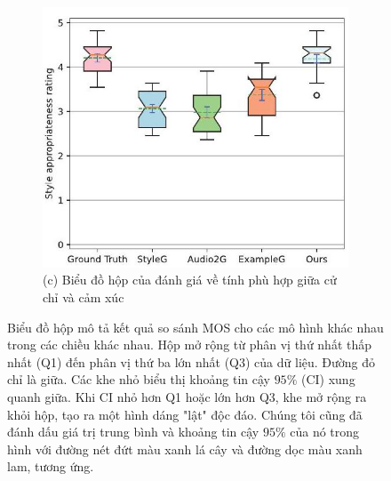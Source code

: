 \begin{figure}[htbp]
\begin{subfigure}[b]{0.3\textwidth}
    \end{subfigure}
    \hfill
    \begin{subfigure}[b]{0.3\textwidth}
        \includegraphics[width=\textwidth]{images/style_score.jpg}
        \caption*{(c) Biểu đồ hộp của đánh giá về tính phù hợp giữa cử chỉ và cảm xúc}
    \end{subfigure}
    \caption[Biểu đồ hộp mô tả kết quả so sánh MOS]{Biểu đồ hộp mô tả kết quả so sánh MOS cho các mô hình khác nhau trong các chiều khác nhau. Hộp mở rộng từ phân vị thứ nhất thấp nhất (Q1) đến phân vị thứ ba lớn nhất (Q3) của dữ liệu. Đường đỏ chỉ là giữa. Các khe nhỏ biểu thị khoảng tin cậy $95\%$ (CI) xung quanh giữa. Khi CI nhỏ hơn Q1 hoặc lớn hơn Q3, khe mở rộng ra khỏi hộp, tạo ra một hình dáng "lật" độc đáo. Chúng tôi cũng đã đánh dấu giá trị trung bình và khoảng tin cậy $95\%$ của nó trong hình với đường nét đứt màu xanh lá cây và đường dọc màu xanh lam, tương ứng.}
    \label{fig:3col}
\end{figure}


